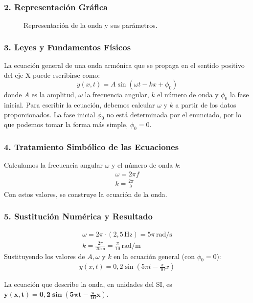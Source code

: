 \subsubsection*{2. Representación Gráfica}
\begin{figure}[H]
    \centering
    \caption{Representación de la onda y sus parámetros.}
\end{figure}

\subsubsection*{3. Leyes y Fundamentos Físicos}
La ecuación general de una onda armónica que se propaga en el sentido positivo del eje X puede escribirse como:
$$ y(x,t) = A \sin(\omega t - kx + \phi_0) $$
donde $A$ es la amplitud, $\omega$ la frecuencia angular, $k$ el número de onda y $\phi_0$ la fase inicial. Para escribir la ecuación, debemos calcular $\omega$ y $k$ a partir de los datos proporcionados. La fase inicial $\phi_0$ no está determinada por el enunciado, por lo que podemos tomar la forma más simple, $\phi_0=0$.

\subsubsection*{4. Tratamiento Simbólico de las Ecuaciones}
Calculamos la frecuencia angular $\omega$ y el número de onda $k$:
\begin{gather}
    \omega = 2\pi f \\
    k = \frac{2\pi}{\lambda}
\end{gather}
Con estos valores, se construye la ecuación de la onda.

\subsubsection*{5. Sustitución Numérica y Resultado}
\begin{gather}
    \omega = 2\pi \cdot (2,5\,\text{Hz}) = 5\pi\,\text{rad/s} \\
    k = \frac{2\pi}{20\,\text{m}} = \frac{\pi}{10}\,\text{rad/m}
\end{gather}
Sustituyendo los valores de $A, \omega$ y $k$ en la ecuación general (con $\phi_0=0$):
\begin{gather}
    y(x,t) = 0,2 \sin\left(5\pi t - \frac{\pi}{10}x\right)
\end{gather}
\begin{cajaresultado}
La ecuación que describe la onda, en unidades del SI, es $\boldsymbol{y(x,t) = 0,2 \sin\left(5\pi t - \frac{\pi}{10}x\right)}$.
\end{cajaresultado}

